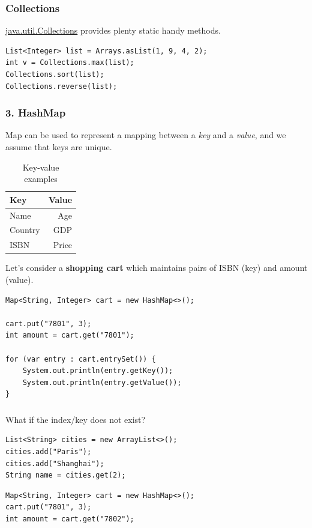 \documentclass[aspectratio=169, 14pt]{beamer}
\begin{document}
\begin{frame}[fragile]
    \frametitle{Collections}
    \href{https://docs.oracle.com/en/java/javase/11/docs/api/java.base/java/util/Collections.html}{java.util.Collections} provides plenty static handy methods.

\begin{verbatim}
List<Integer> list = Arrays.asList(1, 9, 4, 2);
int v = Collections.max(list); 
Collections.sort(list);  
Collections.reverse(list);
\end{verbatim}
\end{frame}


\begin{frame}
    \frametitle{3. HashMap}
    \alert{Map} can be used to represent a mapping between a \emph{key} and a \emph{value}, and we assume that keys are unique.
    \begin{table}
        \caption{Key-value examples}
        \begin{tabular}{lr}
          \toprule
          Key & Value\\
          \midrule
          Name & Age\\
          Country & GDP\\
          ISBN & Price \\
          \bottomrule
        \end{tabular}
    \end{table}
\end{frame}

\begin{frame}[fragile]
    Let's consider a \textbf{shopping cart} which maintains pairs of ISBN (key) and amount (value).

    \begin{verbatim}
Map<String, Integer> cart = new HashMap<>();

cart.put("7801", 3);
int amount = cart.get("7801");

for (var entry : cart.entrySet()) {
    System.out.println(entry.getKey());
    System.out.println(entry.getValue());
}
    \end{verbatim}
\end{frame}

\begin{frame}[fragile]
    \frametitle{}
    What if the index/key does not exist?    
    \begin{verbatim}
List<String> cities = new ArrayList<>();
cities.add("Paris");
cities.add("Shanghai");
String name = cities.get(2);
    \end{verbatim}

    \begin{verbatim}
Map<String, Integer> cart = new HashMap<>();
cart.put("7801", 3);
int amount = cart.get("7802");
    \end{verbatim}  
\end{frame}
\end{document}
